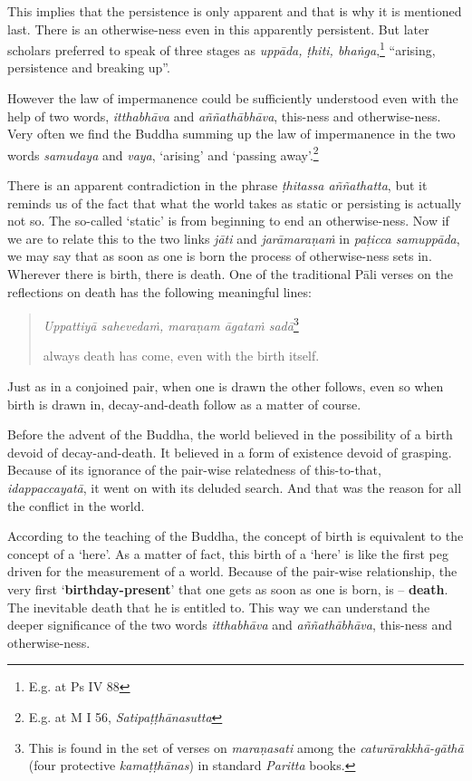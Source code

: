 This implies that the persistence is only apparent and that is why it is mentioned last. There is an otherwise-ness even in this apparently persistent. But later scholars preferred to speak of three stages as \emph{uppāda, ṭhiti, bhaṅga},\footnote{E.g. at Ps IV 88} ``arising, persistence and breaking up''.

However the law of impermanence could be sufficiently understood even with the help of two words, \emph{itthabhāva} and \emph{aññathābhāva}, this-ness and otherwise-ness. Very often we find the Buddha summing up the law of impermanence in the two words \emph{samudaya} and \emph{vaya}, `arising' and `passing away'.\footnote{E.g. at M I 56, \emph{Satipaṭṭhānasutta}}

There is an apparent contradiction in the phrase \emph{ṭhitassa aññathatta}, but it reminds us of the fact that what the world takes as static or persisting is actually not so. The so-called `static' is from beginning to end an otherwise-ness. Now if we are to relate this to the two links \emph{jāti} and \emph{jarāmaraṇaṁ} in \emph{paṭicca samuppāda}, we may say that as soon as one is born the process of otherwise-ness sets in. Wherever there is birth, there is death. One of the traditional Pāli verses on the reflections on death has the following meaningful lines:

\begin{quote}
\emph{Uppattiyā sahevedaṁ, maraṇam āgataṁ sadā}\footnote{This is found in the set of verses on \emph{maraṇasati} among the \emph{caturārakkhā-gāthā} (four protective \emph{kamaṭṭhānas}) in standard \emph{Paritta} books.}

always death has come, even with the birth itself.
\end{quote}

Just as in a conjoined pair, when one is drawn the other follows, even so when birth is drawn in, decay-and-death follow as a matter of course.

Before the advent of the Buddha, the world believed in the possibility of a birth devoid of decay-and-death. It believed in a form of existence devoid of grasping. Because of its ignorance of the pair-wise relatedness of this-to-that, \emph{idappaccayatā}, it went on with its deluded search. And that was the reason for all the conflict in the world.

According to the teaching of the Buddha, the concept of birth is equivalent to the concept of a `here'. As a matter of fact, this birth of a `here' is like the first peg driven for the measurement of a world. Because of the pair-wise relationship, the very first `\textbf{birthday-present}' that one gets as soon as one is born, is -- \textbf{death}. The inevitable death that he is entitled to. This way we can understand the deeper significance of the two words \emph{itthabhāva} and \emph{aññathābhāva}, this-ness and otherwise-ness.


